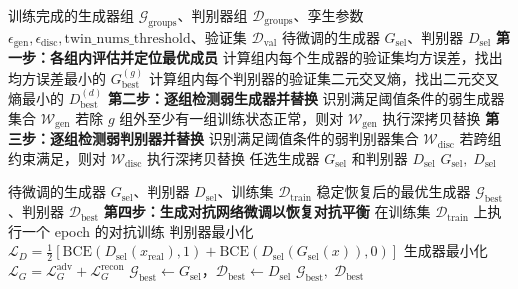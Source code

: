 \begin{algorithm}[!htbp]
    \caption{孪生对抗自体再生与弱模型替换（第一部分）}
    \label{alg:twin_detection_new}
    \begin{algorithmic}[0]
    \Require 训练完成的生成器组 $\mathcal{G}_{\text{groups}}$、判别器组 $\mathcal{D}_{\text{groups}}$、孪生参数 $\epsilon_{\mathrm{gen}},\epsilon_{\mathrm{disc}},\text{twin\_nums\_threshold}$、验证集 $\mathcal{D}_{\mathrm{val}}$
    \Ensure 待微调的生成器 $G_{\mathrm{sel}}$、判别器 $D_{\mathrm{sel}}$
    \State \textbf{第一步：各组内评估并定位最优成员}
        \State 计算组内每个生成器的验证集均方误差，找出均方误差最小的 $G_{\mathrm{best}}^{(g)}$
    \EndFor
        \State 计算组内每个判别器的验证集二元交叉熵，找出二元交叉熵最小的 $D_{\mathrm{best}}^{(d)}$
    \EndFor
    \State \textbf{第二步：逐组检测弱生成器并替换}
        \State 识别满足阈值条件的弱生成器集合 $\mathcal{W}_{\mathrm{gen}}$
        \State 若除 $g$ 组外至少有一组训练状态正常，则对 $\mathcal{W}_{\mathrm{gen}}$ 执行深拷贝替换
    \EndFor
    \State \textbf{第三步：逐组检测弱判别器并替换}
        \State 识别满足阈值条件的弱判别器集合 $\mathcal{W}_{\mathrm{disc}}$
        \State 若跨组约束满足，则对 $\mathcal{W}_{\mathrm{disc}}$ 执行深拷贝替换
    \EndFor
    \State 任选生成器 $G_{\mathrm{sel}}$ 和判别器 $D_{\mathrm{sel}}$
    \State \Return $G_{\mathrm{sel}},\; D_{\mathrm{sel}}$
    \end{algorithmic}
\end{algorithm}

\begin{algorithm}[!htbp]
    \caption{孪生对抗生成对抗网络微调（第二部分）}
    \label{alg:twin_finetune_new}
    \begin{algorithmic}[0]
    \Require 待微调的生成器 $G_{\mathrm{sel}}$、判别器 $D_{\mathrm{sel}}$、训练集 $\mathcal{D}_{\mathrm{train}}$
    \Ensure 稳定恢复后的最优生成器 $\mathcal{G}_{\mathrm{best}}$、判别器 $\mathcal{D}_{\mathrm{best}}$
    \State \textbf{第四步：生成对抗网络微调以恢复对抗平衡}
    \State 在训练集 $\mathcal{D}_{\mathrm{train}}$ 上执行一个 epoch 的对抗训练
    \State 判别器最小化 $\mathcal{L}_D = \frac{1}{2} [ \mathrm{BCE}(D_{\mathrm{sel}}(x_{\mathrm{real}}), 1) + \mathrm{BCE}(D_{\mathrm{sel}}(G_{\mathrm{sel}}(x)), 0) ]$
    \State 生成器最小化 $\mathcal{L}_G = \mathcal{L}_G^{\mathrm{adv}} + \mathcal{L}_G^{\mathrm{recon}}$
    \State $\mathcal{G}_{\mathrm{best}} \gets G_{\mathrm{sel}}$，$\mathcal{D}_{\mathrm{best}} \gets D_{\mathrm{sel}}$
    \State \Return $\mathcal{G}_{\mathrm{best}},\; \mathcal{D}_{\mathrm{best}}$
    \end{algorithmic}
\end{algorithm}

